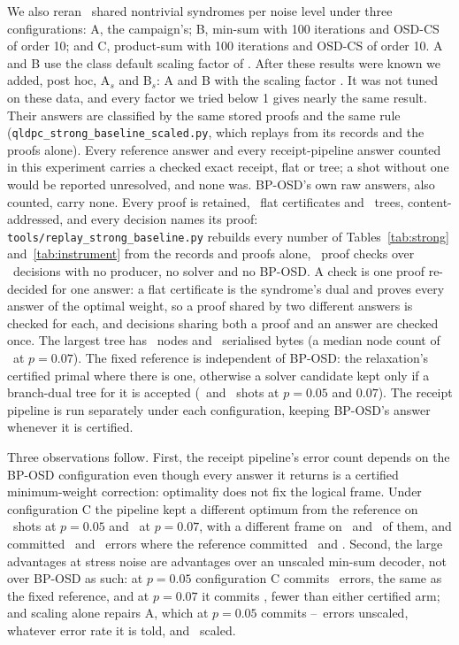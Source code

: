 \documentclass[aps,pra,twocolumn,superscriptaddress,nofootinbib,longbibliography,floatfix]{revtex4-2}
\begin{document}
We also reran \StrongShots\ shared nontrivial syndromes per noise level under three configurations: A, the campaign's; B, min-sum with 100 iterations and OSD-CS of order 10; and C, product-sum with 100 iterations and OSD-CS of order 10. A and B use the class default scaling factor of \LdpcClassAlpha. After these results were known we added, post hoc, A$_s$ and B$_s$: A and B with the scaling factor \ScaledAlpha. It was not tuned on these data, and every factor we tried below 1 gives nearly the same result. Their answers are classified by the same stored proofs and the same rule (\texttt{qldpc\_strong\_baseline\_scaled.py}, which replays from its records and the proofs alone). Every reference answer and every receipt-pipeline answer counted in this experiment carries a checked exact receipt, flat or tree; a shot without one would be reported unresolved, and none was. BP-OSD's own raw answers, also counted, carry none. Every proof is retained, \StrongProofsFlat\ flat certificates and \StrongProofsTree\ trees, content-addressed, and every decision names its proof: \texttt{tools/replay\_strong\_baseline.py} rebuilds every number of Tables~\ref{tab:strong} and~\ref{tab:instrument} from the records and proofs alone, \StrongReplayProofChecks\ proof checks over \StrongReplayDecisions\ decisions with no producer, no solver and no BP-OSD. A check is one proof re-decided for one answer: a flat certificate is the syndrome's dual and proves every answer of the optimal weight, so a proof shared by two different answers is checked for each, and decisions sharing both a proof and an answer are checked once. The largest tree has \StrongTreeNodesMax\ nodes and \StrongTreeBytesMax\ serialised bytes (a median node count of \StrongTreeNodesMedianSeven\ at $p=0.07$). The fixed reference is independent of BP-OSD: the relaxation's certified primal where there is one, otherwise a solver candidate kept only if a branch-dual tree for it is accepted (\StrongTreesFive\ and \StrongTreesSeven\ shots at $p=0.05$ and $0.07$). The receipt pipeline is run separately under each configuration, keeping BP-OSD's answer whenever it is certified.

Three observations follow. First, the receipt pipeline's error count depends on the BP-OSD configuration even though every answer it returns is a certified minimum-weight correction: optimality does not fix the logical frame. Under configuration C the pipeline kept a different optimum from the reference on \StrongFiveOtherOptimum\ shots at $p=0.05$ and \StrongSevenOtherOptimum\ at $p=0.07$, with a different frame on \StrongFiveOtherFrame\ and \StrongSevenOtherFrame\ of them, and committed \StrongFivePipelineStrongest\ and \StrongSevenPipelineStrongest\ errors where the reference committed \StrongFiveReference\ and \StrongSevenReference. Second, the large advantages at stress noise are advantages over an unscaled min-sum decoder, not over BP-OSD as such: at $p=0.05$ configuration C commits \StrongFiveStrongest\ errors, the same as the fixed reference, and at $p=0.07$ it commits \StrongSevenStrongest, fewer than either certified arm; and scaling alone repairs A, which at $p=0.05$ commits \ScanFiveAFailLo--\ScanFiveAFailHi\ errors unscaled, whatever error rate it is told, and \StrongFiveBpScaledA\ scaled.
\end{document}
